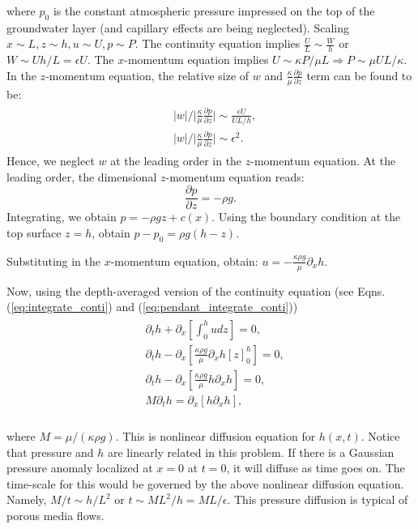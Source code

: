 \documentclass{article}
\begin{document}
%
where  $p_{0}$ is the constant atmospheric pressure impressed on the top of the groundwater layer (and
capillary effects are being neglected). Scaling $x \sim L, z \sim h, u \sim U, p \sim P$. The continuity equation implies $\frac{U}{L} \sim \frac{W}{h}$ or $W \sim Uh/L = \epsilon U$. The $x$-momentum equation implies $U \sim \kappa P/ \mu L \Rightarrow P \sim \mu U L/\kappa$. 
%
In the $z$-momentum equation, the relative size of $w$ and $ \frac{\kappa}{\mu}\frac{\partial p}{\partial z}$ term can be found to be:
\begin{align}
 \begin{split}
  & |w|\bigg/ \bigg|\frac{\kappa}{\mu}\frac{\partial p}{\partial z}\bigg| \sim \frac{\epsilon U}{UL/h},\\ 
  &|w|\bigg/ \bigg|\frac{\kappa}{\mu}\frac{\partial p}{\partial z}\bigg| \sim \epsilon^{2}.
 \end{split}
\end{align}
%
Hence, we neglect $w$ at the leading order in the $z$-momentum equation. 
%
At the leading order, the dimensional $z$-momentum equation reads:
\begin{equation}
 \frac{\partial p}{\partial z} = -\rho g.
\end{equation}
Integrating, we obtain $p = -\rho g z + c(x)$. Using the boundary condition at the top surface $z=h$, obtain $ \boxed{ p - p_{0} = \rho g (h - z)}$.

Substituting in the $x$-momentum equation, obtain:
$\boxed{u = -\frac{\kappa \rho g}{\mu} \partial_{x}h}$.

Now, using the depth-averaged version of the continuity equation (see Eqns. (\ref{eq:integrate_conti}) and (\ref{eq:pendant_integrate_conti}))
\begin{align}
 \begin{split}
  & \partial_{t}h + \partial_{x}\left[ \int_{0}^{h} u dz\right] = 0,\\
  & \partial_{t}h - \partial_{x}\left[ \frac{\kappa \rho g}{\mu} \partial_{x}h [z]_{0}^{h} \right] = 0,\\
  & \partial_{t}h - \partial_{x}\left[ \frac{\kappa \rho g}{\mu} h \partial_{x}h \right] = 0,\\
  & M \partial_{t}h = \partial_{x}\left[ h \partial_{x}h \right],\\
 \end{split}
\end{align}

where $M = \mu/(\kappa \rho g)$. This is nonlinear diffusion equation for $h(x, t)$. Notice that pressure and $h$ are linearly related in this problem. If there is a Gaussian pressure anomaly localized at $x=0$ at $t=0$, it will diffuse as time goes on. The time-scale for this would be governed by the above nonlinear diffusion equation. Namely, $ M/ t \sim h/L^{2}$ or $t \sim ML^{2}/h = ML/\epsilon$. This pressure diffusion is typical of porous media flows. 


 \if@openright\cleardoublepage\else\clearpage\fi
 \cleardoublepage
 \pagestyle{empty}
\end{document}
